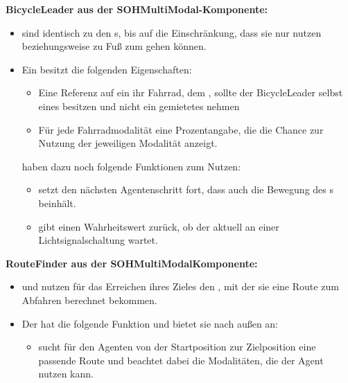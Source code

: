 \textbf{BicycleLeader aus der SOHMultiModal-Komponente:}
\begin{itemize}
    \item {} sind identisch zu den s, bis auf die Einschränkung, dass sie nur  nutzen beziehungsweise zu Fuß zum  gehen können.
    \item Ein  besitzt die folgenden Eigenschaften:
    \begin{itemize}
        \item Eine Referenz auf ein ihr Fahrrad, dem , sollte der BicycleLeader selbst eines besitzen und nicht ein gemietetes nehmen
        \item Für jede Fahrradmodalität eine Prozentangabe, die die Chance zur Nutzung der jeweiligen Modalität anzeigt.
    \end{itemize}
     haben dazu noch folgende Funktionen zum Nutzen:
    \begin{itemize}
        \item {} setzt den nächsten Agentenschritt fort, dass auch die Bewegung des s beinhält.
        \item {} gibt einen Wahrheitswert zurück, ob der  aktuell an einer Lichtsignalschaltung wartet.
    \end{itemize}
\end{itemize}

\textbf{RouteFinder aus der SOHMultiModalKomponente:}
\begin{itemize}
    \item {} und  nutzen für das Erreichen ihres Zieles den , mit der sie eine Route zum Abfahren berechnet bekommen.
    \item Der  hat die folgende Funktion und bietet sie nach außen an:
    \begin{itemize}
        \item {} sucht für den Agenten von der Startposition zur Zielposition eine passende Route und beachtet dabei die Modalitäten, die der Agent nutzen kann.
    \end{itemize}
\end{itemize}

